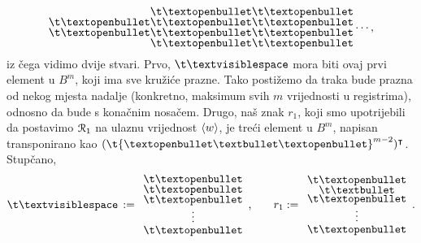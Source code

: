 \begin{equation}
\begin{array}{@{}c@{}}
    \t\textopenbullet\\
    \t\textopenbullet
    \end{array}
    \begin{array}{@{}c@{}}
    \t\textopenbullet\\
    \t\textopenbullet\\
    \t\textopenbullet\\
    \t\textopenbullet
    \end{array}
    \begin{array}{@{}c@{}}
    \t\textopenbullet\\
    \t\textopenbullet\\
    \t\textopenbullet\\
    \t\textopenbullet
    \end{array}\dotsm\text,
\end{equation}
iz čega vidimo dvije stvari. Prvo, $\bl$ mora biti ovaj prvi element u $B^m$, koji ima sve kružiće prazne. Tako postižemo da traka bude prazna od nekog mjesta nadalje (konkretno, maksimum svih $m$ vrijednosti u registrima), odnosno da bude s konačnim nosačem. Drugo, naš znak $r_1$, koji smo upotrijebili da postavimo $\mathcal R_{1}$ na ulaznu vrijednost $\langle w\rangle$, je treći element u $B^m$, napisan transponirano kao $(\t{\textopenbullet\textbullet\textopenbullet}^{m-2})^\intercal$. Stupčano,
\begin{equation}
\renewcommand{\arraystretch}{0.1}
    \bl\,:=\begin{array}{c}
    \t\textopenbullet\\
    \t\textopenbullet\\
        \t\textopenbullet\\[0mm]
        \vdotswithin{\t\textopenbullet}\\[1mm]
    \t\textopenbullet
    \end{array}\text{,\qquad}
    r_1:=\begin{array}{c}
    \t\textopenbullet\\
    \t\textbullet\\
        \t\textopenbullet\\[0mm]
        \vdotswithin{\t\textopenbullet}\\[1mm]
    \t\textopenbullet
    \end{array}\text.
\end{equation}


